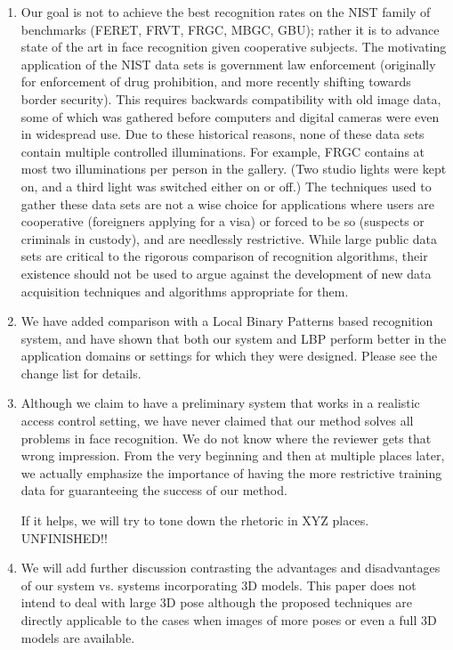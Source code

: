 \documentclass[11pt]{article}
\begin{document}
\begin{enumerate}
\item Our goal is not to achieve the best recognition rates on the NIST family of
benchmarks (FERET, FRVT, FRGC, MBGC, GBU); rather it is to advance state of
the art in face recognition given cooperative subjects.  The motivating
application of the NIST data sets is government law enforcement (originally for
enforcement of drug prohibition, and more recently shifting towards border
security).  This requires backwards compatibility with old image data, some of
which was gathered before computers and digital cameras were even in widespread use.  
Due to these historical reasons, none of these data sets contain multiple controlled
illuminations.  For example, FRGC contains at most two illuminations per person
in the gallery.  (Two studio lights were kept on, and a third light was
switched either on or off.) The techniques used to gather these data sets are not a wise 
choice for applications where users are cooperative (foreigners applying for a visa)
or forced to be so (suspects or criminals in custody), and are needlessly
restrictive.  While large public data sets are critical to the rigorous
comparison of recognition algorithms, their existence should not be used to
argue against the development of new data acquisition techniques and algorithms
appropriate for them.

\item We have added comparison with a Local Binary Patterns based recognition system, and
have shown that both our system and LBP perform better in the application domains or settings
for which they were designed.  Please see the change list for details. 

\item Although we claim to have a preliminary system that works in a realistic
access control setting, we have never claimed that our method solves all problems in face
recognition. We do not know where the reviewer gets that wrong impression. 
From the very beginning and then at multiple places later, we actually emphasize
the importance of having the more restrictive training data for guaranteeing the success 
of our method. 

If it helps, we will try to tone down the rhetoric in XYZ places. UNFINISHED!!

\item We will add further discussion contrasting the advantages and disadvantages of our
system vs. systems incorporating 3D models. This paper does not intend to deal with large 3D pose
although the proposed techniques are directly applicable to the cases when images of more poses or 
even a full 3D models are available. 


\end{enumerate}
\end{document}
